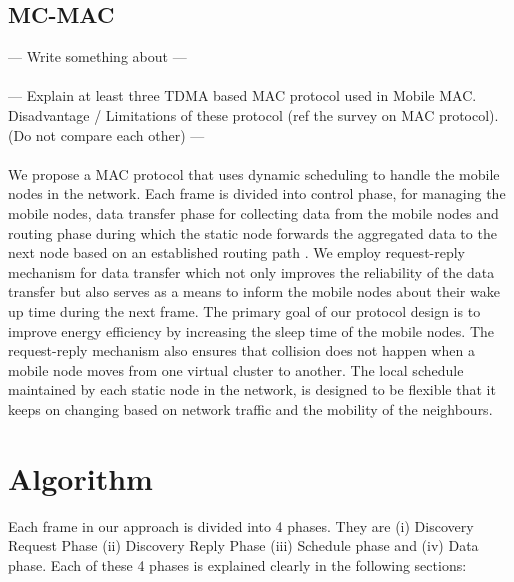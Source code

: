 \documentclass[a4paper, conference, 10pt]{IEEEtran}
\begin{document}
\subsection{MC-MAC}
--- Write something about \cite{mc-mac} ---\\ \\


--- Explain at least three TDMA based MAC protocol used in Mobile MAC. Disadvantage / Limitations of these protocol (ref the survey on MAC protocol). (Do not compare each other) ---\\ \\

We propose a MAC protocol that uses dynamic scheduling to handle the mobile nodes in the network. Each frame is divided into control phase, for managing the mobile nodes, data transfer phase for collecting data from the mobile nodes and routing phase during which the static node forwards the aggregated data to the next node based on an established routing path \cite{aodv}. We employ request-reply mechanism for data transfer which not only improves the reliability of the data transfer but also serves as a means to inform the mobile nodes about their wake up time during the next frame. The primary goal of our protocol design is to improve energy efficiency by increasing the sleep time of the mobile nodes. The request-reply mechanism also ensures that collision does not happen when a mobile node moves from one virtual cluster \cite{smac} to another. The local schedule maintained by each static node in the network, is designed to be flexible that it keeps on changing based on network traffic and the mobility of the neighbours.


\section{Algorithm}

Each frame in our approach is divided into 4 phases. They are (i) Discovery Request Phase (ii) Discovery Reply Phase (iii) Schedule phase and (iv) Data phase. Each of these 4 phases is explained clearly in the following sections:
\end{document}
